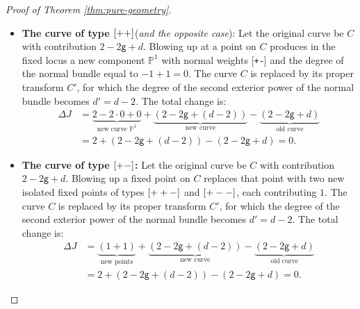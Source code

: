 \documentclass[10pt,a4paper]{amsart}
\newcommand{\lm}{\textup{\texttt{-}}}
\newcommand{\lp}{\textup{\texttt{+}}}
\begin{document}
\begin{proof}[Proof of Theorem \ref{thm:pure-geometry}]
\begin{itemize}
    \item \textbf{The curve of type $[\lp\lp]$}(\textit{and the opposite case}):  Let the original curve be $C$ with contribution $2 - 2\mathsf{g} + d$. Blowing up at a point on $C$ produces in the fixed locus a new component $\mathbb P^1$ with normal weights [\lp\lm] and the degree of the normal bundle equal to $-1+1=0$. The curve $C$ is replaced by its proper transform $C'$, for which the degree of the second exterior power of the normal bundle becomes $d' = d-2$. The total change is:
    \begin{align}
        \Delta J &= \underbrace{2-2\cdot 0+0}_{\text{new curve }\mathbb P^1} + \underbrace{(2 - 2\mathsf{g} + (d-2))}_{\text{new curve}} - \underbrace{(2 - 2\mathsf{g} + d)}_{\text{old curve}} \\
        &= 2 + (2 - 2\mathsf{g} + (d - 2)) - (2 - 2\mathsf{g} + d) = 0.
    \end{align}
    \item \textbf{The curve of type $[\lp\lm]$:} Let the original curve be $C$ with contribution $2 - 2\mathsf{g} + d$. Blowing up a fixed point on $C$ replaces that point with two new isolated fixed points of types $[\lp\lp\lm]$ and $[\lp\lm\lm]$, each contributing $1$. The curve $C$ is replaced by its proper transform $C'$, for which the degree of the second exterior power of the normal bundle becomes $d' = d-2$. The total change is:
    \begin{align}
        \Delta J &= \underbrace{(1 + 1)}_{\text{new points}} + \underbrace{(2 - 2\mathsf{g} + (d-2))}_{\text{new curve}} - \underbrace{(2 - 2\mathsf{g} + d)}_{\text{old curve}} \\
        &= 2 + (2 - 2\mathsf{g} + (d - 2))
        - (2 - 2\mathsf{g} + d) = 0.
    \end{align}
\end{itemize}


\end{proof}
\end{document}
